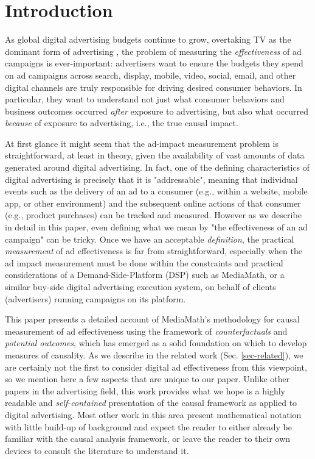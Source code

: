 \documentclass[11pt,a4paper]{article}
\theoremstyle{definition}
\theoremstyle{remark}
\theoremstyle{definition}
\theoremstyle{definition}
\theoremstyle{definition}
\theoremstyle{definition}
\theoremstyle{definition}
\theoremstyle{definition}
\begin{document}
\section{Introduction}

As global digital advertising budgets continue to grow, overtaking TV as the dominant form of advertising \cite{emarketer-2016},
the problem of measuring the \textit{effectiveness} of ad campaigns is ever-important: 
advertisers want to ensure the budgets they spend on ad campaigns across search, display, mobile, video, social, email, and other digital channels are truly responsible for driving desired consumer behaviors. In particular, they want to understand not just what consumer behaviors and business outcomes occurred \textit{after} exposure to advertising, but also what occurred \textit{because} of exposure to advertising, i.e., the true causal impact.

At first glance it might seem that the ad-impact measurement problem is  straightforward, at least in theory,  
given the availability of vast amounts of data generated around digital advertising. In fact, one of the defining characteristics of digital advertising is precisely that it is "addressable", meaning that individual events such as the delivery of an ad to a consumer (e.g., within a website, mobile app, or other environment) and the subsequent online actions of that consumer (e.g., product purchases) can be tracked and measured. However as we describe in detail in this paper, even defining what we mean by "the effectiveness of an ad campaign" can be tricky. Once we have an acceptable \textit{definition}, the practical \textit{measurement} of ad effectiveness is far from straightforward, especially when the ad impact measurement must be done within the constraints and practical considerations of a Demand-Side-Platform (DSP) such as MediaMath, or a similar buy-side digital advertising execution system, on behalf of clients (advertisers) running campaigns on its platform.

This paper presents a detailed account of MediaMath's methodology for causal measurement of ad effectiveness 
using the  framework of \textit{counterfactuals} and \textit{potential outcomes}, which has emerged as a solid foundation on which to develop measures of causality. As we describe in the related work (Sec. \ref{sec-related}), we are certainly not the first to consider digital ad effectiveness from this viewpoint, so we mention here a few aspects that are unique to our paper. Unlike other papers in the advertising field, this work provides what we hope is a highly readable and \textit{self-contained} presentation of the causal framework as applied to digital advertising. Most other work in this area present mathematical notation with little build-up of background and expect the reader to either already be familiar with the causal analysis framework, or leave the reader to their own devices to consult the literature to understand it. 
\end{document}
